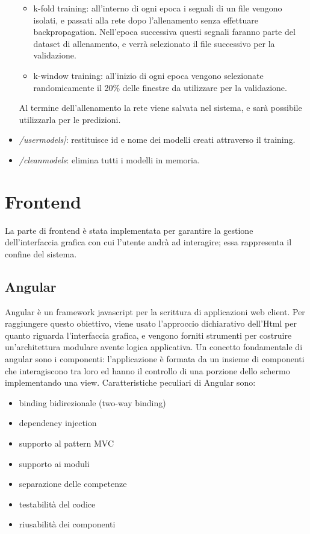 \documentclass{article}
\begin{document}
\begin{itemize}
\begin{itemize}
	\item k-fold training: all'interno di ogni epoca i segnali di un file vengono isolati, e passati alla rete dopo l'allenamento senza 	effettuare backpropagation. Nell'epoca successiva questi segnali faranno parte del dataset di allenamento, e verrà selezionato il file successivo per la validazione.
	\item k-window training: all'inizio di ogni epoca vengono selezionate randomicamente il 20\% delle finestre da utilizzare per la validazione.
\end{itemize}
Al termine dell'allenamento la rete viene salvata nel sistema, e sarà possibile utilizzarla per le predizioni. 
\item \textit{/usermodels]}: restituisce id e nome dei modelli creati attraverso il training. 
\item \textit{/cleanmodels}: elimina tutti i modelli in memoria. 
\end{itemize}


\section{Frontend}
La parte di frontend è stata implementata per garantire la gestione dell'interfaccia grafica con cui l'utente andrà ad interagire; essa rappresenta il confine del sistema.

\subsection{Angular}
Angular è un framework javascript  per la scrittura di applicazioni web  client. Per raggiungere questo obiettivo, viene usato l'approccio dichiarativo dell'Html per quanto riguarda l'interfaccia grafica, e vengono forniti strumenti per costruire un'architettura modulare avente logica applicativa.
Un concetto fondamentale di angular sono i componenti: l'applicazione è formata da un insieme di componenti che interagiscono tra loro ed  hanno il controllo di una porzione dello schermo implementando una view.
Caratteristiche peculiari di Angular sono:
\begin{itemize}
\item binding bidirezionale (two-way binding)
\item dependency injection
\item supporto al pattern MVC
\item supporto ai moduli
\item separazione delle competenze
\item testabilità del codice
\item riusabilità dei componenti
\end{itemize}
\end{document}
